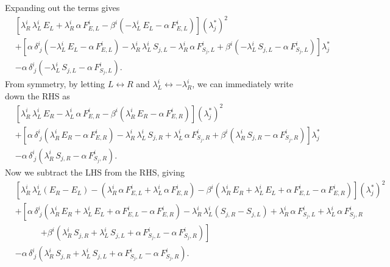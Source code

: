\documentclass[10pt,preprint]{../aastex}
\begin{document}
Expanding out the terms gives
\begin{align}
&\left[\lambda^{i}_{R}\,\lambda^{i}_{L}\,E_{L}+\lambda^{i}_{R}\,\alpha\,F^{i}_{E,L}-\beta^{i}\left(-\lambda^{i}_{L}\,E_{L}-\alpha\,F^{i}_{E,L}\right)\right]\left(\lambda^{*}_{j}\right)^{2}\\
&+\left[\alpha\,\delta^{i}_{~j}\left(-\lambda^{i}_{L}\,E_{L}-\alpha\,F^{i}_{E,L}\right)-\lambda^{i}_{R}\,\lambda^{i}_{L}\,S_{j,L}-\lambda^{i}_{R}\,\alpha\,F^{i}_{S_{j},L}+\beta^{i}\left(-\lambda^{i}_{L}\,S_{j,L}-\alpha\,F^{i}_{S_{j},L}\right)\right]\lambda^{*}_{j}\\
&-\alpha\,\delta^{i}_{~j}\left(-\lambda^{i}_{L}\,S_{j,L}-\alpha\,F^{i}_{S_{j},L}\right).
\end{align}
From symmetry, by letting $L\leftrightarrow R$ and $\lambda^{i}_{L}\leftrightarrow-\lambda^{i}_{R}$, we can immediately write down the RHS as
\begin{align}
&\left[\lambda^{i}_{R}\,\lambda^{i}_{L}\,E_{R}-\lambda^{i}_{L}\,\alpha\,F^{i}_{E,R}-\beta^{i}\left(\lambda^{i}_{R}\,E_{R}-\alpha\,F^{i}_{E,R}\right)\right]\left(\lambda^{*}_{j}\right)^{2}\\
&+\left[\alpha\,\delta^{i}_{~j}\left(\lambda^{i}_{R}\,E_{R}-\alpha\,F^{i}_{E,R}\right)-\lambda^{i}_{R}\,\lambda^{i}_{L}\,S_{j,R}+\lambda^{i}_{L}\,\alpha\,F^{i}_{S_{j},R}+\beta^{i}\left(\lambda^{i}_{R}\,S_{j,R}-\alpha\,F^{i}_{S_{j},R}\right)\right]\lambda^{*}_{j}\\
&-\alpha\,\delta^{i}_{~j}\left(\lambda^{i}_{R}\,S_{j,R}-\alpha\,F^{i}_{S_{j},R}\right).
\end{align}
Now we subtract the LHS from the RHS, giving
\begin{align}
&\left[\lambda^{i}_{R}\,\lambda^{i}_{L}\left(E_{R}-E_{L}\right)-\left(\lambda^{i}_{R}\,\alpha\,F^{i}_{E,L}+\lambda^{i}_{L}\,\alpha\,F^{i}_{E,R}\right)-\beta^{i}\left(\lambda^{i}_{R}\,E_{R}+\lambda^{i}_{L}\,E_{L}+\alpha\,F^{i}_{E,L}-\alpha\,F^{i}_{E,R}\right)\right]\left(\lambda^{*}_{j}\right)^{2}\\
&+\left[\alpha\,\delta^{i}_{~j}\left(\lambda^{i}_{R}\,E_{R}+\lambda^{i}_{L}\,E_{L}+\alpha\,F^{i}_{E,L}-\alpha\,F^{i}_{E,R}\right)-\lambda^{i}_{R}\,\lambda^{i}_{L}\left(S_{j,R}-S_{j,L}\right)+\lambda^{i}_{R}\,\alpha\,F^{i}_{S_{j},L}+\lambda^{i}_{L}\,\alpha\,F^{i}_{S_{j},R}\right.\\
&\hspace{3em}\left.+\beta^{i}\left(\lambda^{i}_{R}\,S_{j,R}+\lambda^{i}_{L}\,S_{j,L}+\alpha\,F^{i}_{S_{j},L}-\alpha\,F^{i}_{S_{j},R}\right)\right]\\
&-\alpha\,\delta^{i}_{~j}\left(\lambda^{i}_{R}\,S_{j,R}+\lambda^{i}_{L}\,S_{j,L}+\alpha\,F^{i}_{S_{j},L}-\alpha\,F^{i}_{S_{j},R}\right).
\end{align}
\end{document}

